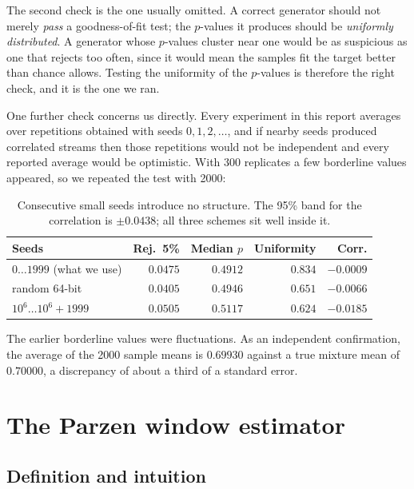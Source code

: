 \documentclass[11pt]{article}
\begin{document}
The second check is the one usually omitted. A correct generator should not merely
\emph{pass} a goodness-of-fit test; the $p$-values it produces
should be \emph{uniformly distributed}. A generator whose $p$-values cluster near one would
be as suspicious as one that rejects too often, since it would mean the samples fit the
target better than chance allows. Testing the uniformity of the $p$-values is therefore the
right check, and it is the one we ran.

One further check concerns us directly. Every experiment in this report averages over
repetitions obtained with seeds $0, 1, 2, \dots$, and if nearby seeds produced correlated
streams then those repetitions would not be independent and every reported average would be
optimistic. With 300 replicates a few borderline values appeared, so we repeated the test
with 2000:

\begin{table}[H]
\centering
\begin{tabular}{@{}lrrrr@{}}
\toprule
\textbf{Seeds} & \textbf{Rej.\ 5\%} & \textbf{Median $p$} &
\textbf{Uniformity} & \textbf{Corr.} \\
\midrule
$0 \dots 1999$ (what we use) & $0.0475$ & $0.4912$ & $0.834$ & $-0.0009$ \\
random 64-bit                & $0.0405$ & $0.4946$ & $0.651$ & $-0.0066$ \\
$10^6 \dots 10^6{+}1999$     & $0.0505$ & $0.5117$ & $0.624$ & $-0.0185$ \\
\bottomrule
\end{tabular}
\caption{Consecutive small seeds introduce no structure. The 95\% band for the correlation
is $\pm 0.0438$; all three schemes sit well inside it.}
\label{tab:seeds}
\end{table}

The earlier borderline values were fluctuations. As an independent confirmation, the average
of the 2000 sample means is $0.69930$ against a true mixture mean of $0.70000$, a discrepancy
of about a third of a standard error.

\section{The Parzen window estimator}

\subsection{Definition and intuition}
\end{document}
